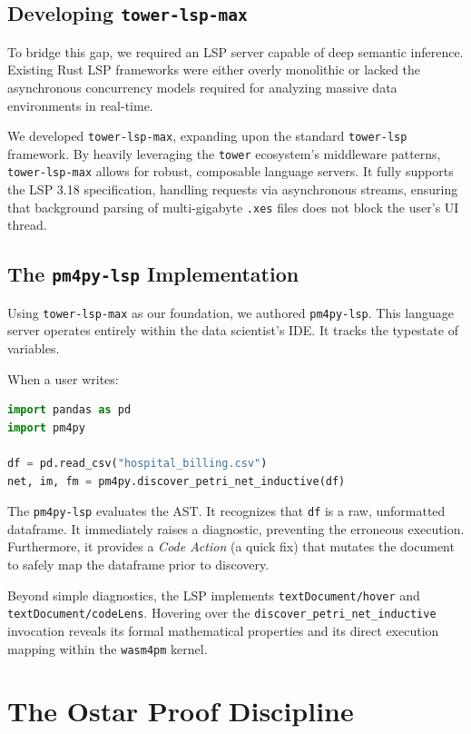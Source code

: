 \documentclass[11pt,twoside,openright]{book}
\begin{document}
\section{Developing \texttt{tower-lsp-max}}
To bridge this gap, we required an LSP server capable of deep semantic inference. Existing Rust LSP frameworks were either overly monolithic or lacked the asynchronous concurrency models required for analyzing massive data environments in real-time.

We developed \texttt{tower-lsp-max}, expanding upon the standard \texttt{tower-lsp} framework. By heavily leveraging the \texttt{tower} ecosystem's middleware patterns, \texttt{tower-lsp-max} allows for robust, composable language servers. It fully supports the LSP 3.18 specification, handling requests via asynchronous streams, ensuring that background parsing of multi-gigabyte \texttt{.xes} files does not block the user's UI thread.

\section{The \texttt{pm4py-lsp} Implementation}
Using \texttt{tower-lsp-max} as our foundation, we authored \texttt{pm4py-lsp}. This language server operates entirely within the data scientist's IDE. It tracks the typestate of variables. 

When a user writes:
\begin{lstlisting}[language=Python]
import pandas as pd
import pm4py

df = pd.read_csv("hospital_billing.csv")
net, im, fm = pm4py.discover_petri_net_inductive(df)
\end{lstlisting}

The \texttt{pm4py-lsp} evaluates the AST. It recognizes that \texttt{df} is a raw, unformatted dataframe. It immediately raises a diagnostic, preventing the erroneous execution. Furthermore, it provides a \textit{Code Action} (a quick fix) that mutates the document to safely map the dataframe prior to discovery.

Beyond simple diagnostics, the LSP implements \texttt{textDocument/hover} and \texttt{textDocument/codeLens}. Hovering over the \texttt{discover\_petri\_net\_inductive} invocation reveals its formal mathematical properties and its direct execution mapping within the \texttt{wasm4pm} kernel.

\chapter{The Ostar Proof Discipline}
\end{document}
